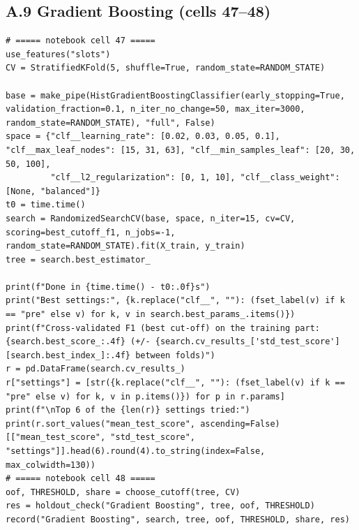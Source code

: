 \documentclass[12pt,a4paper]{article}
\begin{document}
\subsection*{A.9 Gradient Boosting (cells 47--48)}
\begin{lstlisting}[style=code]
# ===== notebook cell 47 =====
use_features("slots")
CV = StratifiedKFold(5, shuffle=True, random_state=RANDOM_STATE)

base = make_pipe(HistGradientBoostingClassifier(early_stopping=True, validation_fraction=0.1, n_iter_no_change=50, max_iter=3000, random_state=RANDOM_STATE), "full", False)
space = {"clf__learning_rate": [0.02, 0.03, 0.05, 0.1], "clf__max_leaf_nodes": [15, 31, 63], "clf__min_samples_leaf": [20, 30, 50, 100],
         "clf__l2_regularization": [0, 1, 10], "clf__class_weight": [None, "balanced"]}
t0 = time.time()
search = RandomizedSearchCV(base, space, n_iter=15, cv=CV, scoring=best_cutoff_f1, n_jobs=-1, random_state=RANDOM_STATE).fit(X_train, y_train)
tree = search.best_estimator_

print(f"Done in {time.time() - t0:.0f}s")
print("Best settings:", {k.replace("clf__", ""): (fset_label(v) if k == "pre" else v) for k, v in search.best_params_.items()})
print(f"Cross-validated F1 (best cut-off) on the training part: {search.best_score_:.4f} (+/- {search.cv_results_['std_test_score'][search.best_index_]:.4f} between folds)")
r = pd.DataFrame(search.cv_results_)
r["settings"] = [str({k.replace("clf__", ""): (fset_label(v) if k == "pre" else v) for k, v in p.items()}) for p in r.params]
print(f"\nTop 6 of the {len(r)} settings tried:")
print(r.sort_values("mean_test_score", ascending=False)[["mean_test_score", "std_test_score", "settings"]].head(6).round(4).to_string(index=False, max_colwidth=130))
# ===== notebook cell 48 =====
oof, THRESHOLD, share = choose_cutoff(tree, CV)
res = holdout_check("Gradient Boosting", tree, oof, THRESHOLD)
record("Gradient Boosting", search, tree, oof, THRESHOLD, share, res)
\end{lstlisting}
\end{document}
